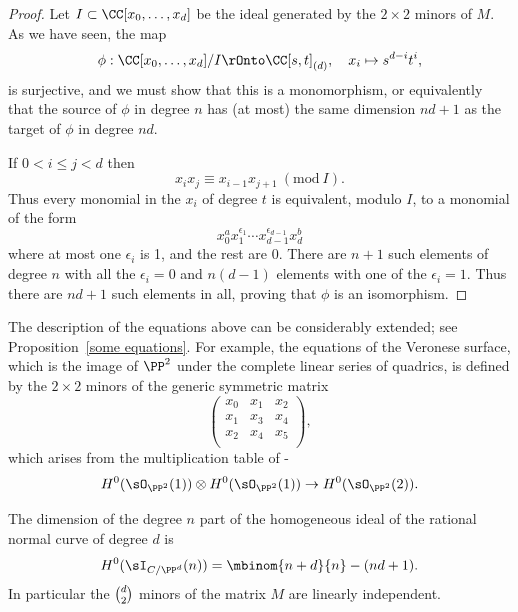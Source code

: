 \begin{proof}
Let $I\subset \CC[x_0,\dots, x_d]$ be the ideal generated by the $2\times 2$ minors of $M$.
As we have seen, the map
$$
\phi: \CC[x_0, \dots, x_d]/I \rOnto \CC[s,t]_{(d)},\quad x_i\mapsto s^{d-i}t^i,
$$
is surjective, and we must show that this is a monomorphism, or equivalently that the source of $\phi$ in degree $n$ has
(at most) the same dimension $nd+1$ as the target of $\phi$ in degree $nd$.

If $0<i\leq j<d$ then
$$
x_ix_j \equiv x_{i-1}x_{j+1}  \ (\mathrm{ mod}\ I).
$$
Thus every monomial in the $x_i$ of degree $t$ is equivalent, modulo $I$, to a monomial of the form
 $$
 x_0^ax_1^{\epsilon_1}\cdots x_{d-1}^{\epsilon_{d-1}}x_d^b
 $$
 where at most one $\epsilon_i$ is 1, and the rest are 0. There are $n+1$ such elements of degree $n$ with all the $\epsilon_i = 0$
 and $n(d-1)$ elements with one of the $\epsilon_i = 1$. Thus there are $nd+1$ such elements in all, proving that $\phi$ is
 an isomorphism.
  \end{proof}

\begin{fact}\label{Veronese equations fact}
The description of the equations above can be considerably extended;
see Proposition~\ref{some equations}. For example, the equations of the
%
Veronese surface, which is the image of $\PP^{2}$
 under the complete linear series of quadrics, is defined by the $2\times 2$ minors of the generic
 symmetric matrix
 $$
 \begin{pmatrix}
 x_{0}&x_{1}&x_{2}\\
  x_{1}&x_{3}&x_{4}\\
   x_{2}&x_{4}&x_{5}\\
\end{pmatrix}
,
$$
which arises from the multiplication table of
\belowdisplayskip-\baselineskip
$$
H^{0}(\sO_{\PP^{2}}(1)) \otimes H^{0}(\sO_{\PP^{2}}(1)) \to H^{0}(\sO_{\PP^{2}}(2)).
$$
\end{fact}

\vspace*{3pt}

\begin{corollary}\label{forms vanishing on the RNC}
The dimension of the degree $n$ part of the homogeneous ideal of the
rational normal curve
%
of degree $d$ is
$$
H^0(\sI_{C/\PP^d}(n)) = \mbinom{n+d}{n} - (nd+1).
$$
In particular
the $\tbinom{d}{ 2}$ minors of the matrix $M$ are linearly independent.
\end{corollary}

